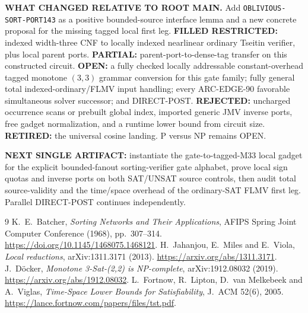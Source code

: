 \documentclass[11pt]{article}
\begin{document}
\textbf{WHAT CHANGED RELATIVE TO ROOT MAIN.} Add \texttt{OBLIVIOUS-SORT-PORT143} as a positive bounded-source interface lemma and a new concrete proposal for the missing tagged local first leg. \textbf{FILLED RESTRICTED:} indexed width-three CNF to locally indexed nearlinear ordinary Tseitin verifier, plus local parent ports. \textbf{PARTIAL:} parent-port-to-dense-tag transfer on this constructed circuit. \textbf{OPEN:} a fully checked locally addressable constant-overhead tagged monotone $(3,3)$ grammar conversion for this gate family; fully general total indexed-ordinary/FLMV input handling; every ARC-EDGE-90 favorable simultaneous solver successor; and DIRECT-POST. \textbf{REJECTED:} uncharged occurrence scans or prebuilt global index, imported generic JMV inverse ports, free gadget normalization, and a runtime lower bound from circuit size. \textbf{RETIRED:} the universal cosine landing. P versus NP remains OPEN.

\textbf{NEXT SINGLE ARTIFACT:} instantiate the gate-to-tagged-M33 local gadget for the explicit bounded-fanout sorting-verifier gate alphabet, prove local sign quotas and inverse ports on both SAT/UNSAT source controls, then audit total source-validity and the time/space overhead of the ordinary-SAT FLMV first leg. Parallel DIRECT-POST continues independently.
\begin{thebibliography}{9}
 K.~E.~Batcher, \emph{Sorting Networks and Their Applications}, AFIPS Spring Joint Computer Conference (1968), pp.~307--314. \url{https://doi.org/10.1145/1468075.1468121}.
 H.~Jahanjou, E.~Miles and E.~Viola, \emph{Local reductions}, arXiv:1311.3171 (2013). \url{https://arxiv.org/abs/1311.3171}.
 J.~D\"ocker, \emph{Monotone 3-Sat-(2,2) is NP-complete}, arXiv:1912.08032 (2019). \url{https://arxiv.org/abs/1912.08032}.
 L.~Fortnow, R.~Lipton, D.~van Melkebeek and A.~Viglas, \emph{Time-Space Lower Bounds for Satisfiability}, J.~ACM 52(6), 2005. \url{https://lance.fortnow.com/papers/files/tst.pdf}.
\end{thebibliography}
\end{document}
